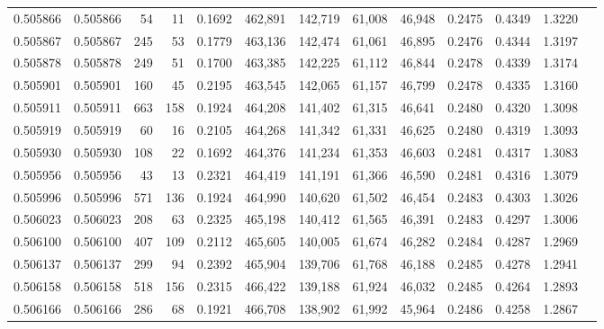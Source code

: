 \begin{tabular}{rrrrrrrrrrrrr}
0.505866 & 0.505866 &    54 &    11 &                                     0.1692 & 462,891 & 142,719 &  61,008 &  46,948 & 0.2475 & 0.4349 & 1.3220 \\
0.505867 & 0.505867 &   245 &    53 &                                     0.1779 & 463,136 & 142,474 &  61,061 &  46,895 & 0.2476 & 0.4344 & 1.3197 \\
0.505878 & 0.505878 &   249 &    51 &                                     0.1700 & 463,385 & 142,225 &  61,112 &  46,844 & 0.2478 & 0.4339 & 1.3174 \\
0.505901 & 0.505901 &   160 &    45 &                                     0.2195 & 463,545 & 142,065 &  61,157 &  46,799 & 0.2478 & 0.4335 & 1.3160 \\
0.505911 & 0.505911 &   663 &   158 &                                     0.1924 & 464,208 & 141,402 &  61,315 &  46,641 & 0.2480 & 0.4320 & 1.3098 \\
0.505919 & 0.505919 &    60 &    16 &                                     0.2105 & 464,268 & 141,342 &  61,331 &  46,625 & 0.2480 & 0.4319 & 1.3093 \\
0.505930 & 0.505930 &   108 &    22 &                                     0.1692 & 464,376 & 141,234 &  61,353 &  46,603 & 0.2481 & 0.4317 & 1.3083 \\
0.505956 & 0.505956 &    43 &    13 &                                     0.2321 & 464,419 & 141,191 &  61,366 &  46,590 & 0.2481 & 0.4316 & 1.3079 \\
0.505996 & 0.505996 &   571 &   136 &                                     0.1924 & 464,990 & 140,620 &  61,502 &  46,454 & 0.2483 & 0.4303 & 1.3026 \\
0.506023 & 0.506023 &   208 &    63 &                                     0.2325 & 465,198 & 140,412 &  61,565 &  46,391 & 0.2483 & 0.4297 & 1.3006 \\
0.506100 & 0.506100 &   407 &   109 &                                     0.2112 & 465,605 & 140,005 &  61,674 &  46,282 & 0.2484 & 0.4287 & 1.2969 \\
0.506137 & 0.506137 &   299 &    94 &                                     0.2392 & 465,904 & 139,706 &  61,768 &  46,188 & 0.2485 & 0.4278 & 1.2941 \\
0.506158 & 0.506158 &   518 &   156 &                                     0.2315 & 466,422 & 139,188 &  61,924 &  46,032 & 0.2485 & 0.4264 & 1.2893 \\
0.506166 & 0.506166 &   286 &    68 &                                     0.1921 & 466,708 & 138,902 &  61,992 &  45,964 & 0.2486 & 0.4258 & 1.2867 \\

\end{tabular}
